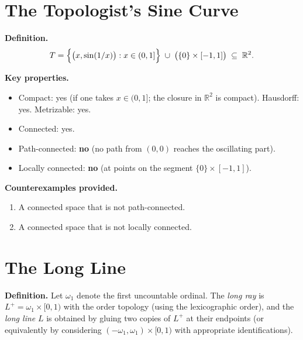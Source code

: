 \documentclass[11pt,a4paper,twoside]{book}
\theoremstyle{remark}
\theoremstyle{definition}
\theoremstyle{definition}
\begin{document}
\section{The Topologist's Sine Curve}
\label{app:topologist-sine-curve}

\textbf{Definition.}
\[
  T = \Bigl\{\bigl(x,\sin(1/x)\bigr) : x\in(0,1]\Bigr\}
      \;\cup\; \bigl(\{0\}\times[-1,1]\bigr)
  \;\subseteq\; \mathbb{R}^2.
\]

\medskip
\textbf{Key properties.}
\begin{itemize}
  \item Compact: yes (if one takes $x\in(0,1]$; the closure in
        $\mathbb{R}^2$ is compact). \quad Hausdorff: yes. \quad
        Metrizable: yes.
  \item Connected: yes.
  \item Path-connected: \textbf{no} (no path from $(0,0)$ reaches the
        oscillating part).
  \item Locally connected: \textbf{no} (at points on the segment
        $\{0\}\times[-1,1]$).
\end{itemize}

\textbf{Counterexamples provided.}
\begin{enumerate}
  \item A connected space that is not path-connected.
  \item A connected space that is not locally connected.
\end{enumerate}

\section{The Long Line}
\label{app:long-line}

\textbf{Definition.}
Let $\omega_1$ denote the first uncountable ordinal.  The \emph{long
ray} is $L^+ = \omega_1\times[0,1)$ with the order topology (using the
lexicographic order), and the \emph{long line} $L$ is obtained by
gluing two copies of $L^+$ at their endpoints (or equivalently by
considering $(-\omega_1,\omega_1)\times[0,1)$ with appropriate
identifications).
\end{document}
